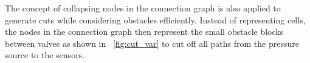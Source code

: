 The concept of collapsing nodes in the connection graph
is also applied to generate cuts while considering obstacles 
efficiently.  Instead of representing cells, 
the nodes in the connection graph then represent the small obstacle blocks between valves
as shown in \figname~\ref{fig:cut_var} to cut off all paths from the pressure
source to the sensors. 


